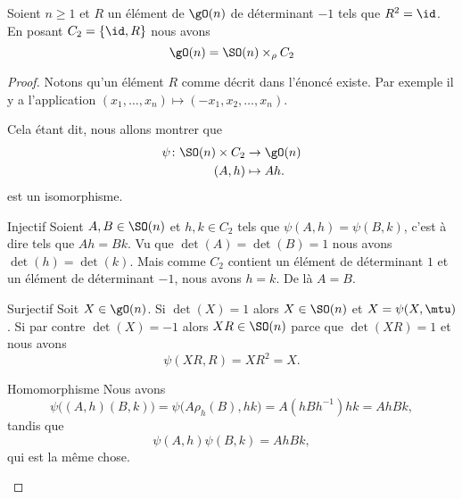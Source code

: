 \begin{proposition}      \label{PROPooDHYWooXxEXvl}
    Soient \( n\geq 1\) et \( R\) un élément de \( \gO(n)\) de déterminant \( -1\) tels que \( R^2=\id\). En posant \( C_2=\{ \id,R \}\) nous avons
    \begin{equation}
        \gO(n)=\SO(n)\times_{\rho} C_2
    \end{equation}
\end{proposition}

\begin{proof}
    Notons qu'un élément \( R\) comme décrit dans l'énoncé existe. Par exemple il y a l'application  \( (x_1,\ldots, x_n)\mapsto (-x_1,x_2,\ldots, x_n)\). 

    Cela étant dit, nous allons montrer que
    \begin{equation}
        \begin{aligned}
            \psi\colon \SO(n)\times C_2&\to \gO(n) \\
            (A,h)&\mapsto Ah.
        \end{aligned}
    \end{equation}
    est un isomorphisme.
    \begin{subproof}
        \item[Injectif]
            Soient \( A,B\in \SO(n)\) et \( h,k\in C_2\) tels que \( \psi(A,h)=\psi(B,k)\), c'est à dire tels que \( Ah=Bk\). Vu que \( \det(A)=\det(B)=1\) nous avons \( \det(h)=\det(k)\). Mais comme \( C_2\) contient un élément de déterminant \( 1\) et un élément de déterminant \( -1\), nous avons \( h=k\). De là \( A=B\).
        \item[Surjectif]
            Soit \( X\in\gO(n)\). Si \( \det(X)=1\) alors \( X\in \SO(n)\) et \( X=\psi(X,\mtu)\). Si par contre \( \det(X)=-1\) alors \( XR\in\SO(n)\) parce que \( \det(XR)=1\) et nous avons
            \begin{equation}
                \psi(XR,R)=XR^2=X.
            \end{equation}
        \item[Homomorphisme]
            Nous avons
            \begin{equation}
                \psi\Big( (A,h)(B,k) \Big)=\psi\big( A\rho_h(B),hk \big)=A(hBh^{-1})hk=AhBk,
            \end{equation}
            tandis que
            \begin{equation}
                \psi(A,h)\psi(B,k)=AhBk,
            \end{equation}
            qui est la même chose.
    \end{subproof}
\end{proof}

